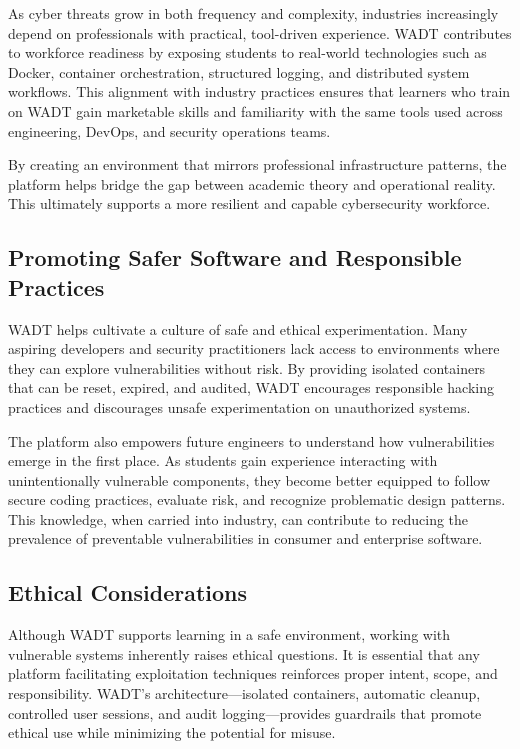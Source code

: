 \documentclass[12pt,titlepage]{article}
\begin{document}
As cyber threats grow in both frequency and complexity, industries increasingly depend on professionals with practical, tool-driven experience. WADT contributes to workforce readiness by exposing students to real-world technologies such as Docker, container orchestration, structured logging, and distributed system workflows. This alignment with industry practices ensures that learners who train on WADT gain marketable skills and familiarity with the same tools used across engineering, DevOps, and security operations teams.

By creating an environment that mirrors professional infrastructure patterns, the platform helps bridge the gap between academic theory and operational reality. This ultimately supports a more resilient and capable cybersecurity workforce.

\subsection{Promoting Safer Software and Responsible Practices}

WADT helps cultivate a culture of safe and ethical experimentation. Many aspiring developers and security practitioners lack access to environments where they can explore vulnerabilities without risk. By providing isolated containers that can be reset, expired, and audited, WADT encourages responsible hacking practices and discourages unsafe experimentation on unauthorized systems.

The platform also empowers future engineers to understand how vulnerabilities emerge in the first place. As students gain experience interacting with unintentionally vulnerable components, they become better equipped to follow secure coding practices, evaluate risk, and recognize problematic design patterns. This knowledge, when carried into industry, can contribute to reducing the prevalence of preventable vulnerabilities in consumer and enterprise software.

\subsection{Ethical Considerations}

Although WADT supports learning in a safe environment, working with vulnerable systems inherently raises ethical questions. It is essential that any platform facilitating exploitation techniques reinforces proper intent, scope, and responsibility. WADT’s architecture—isolated containers, automatic cleanup, controlled user sessions, and audit logging—provides guardrails that promote ethical use while minimizing the potential for misuse.
\end{document}
